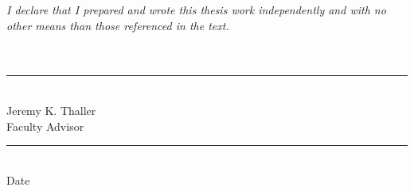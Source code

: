 \textit{I declare that I prepared and wrote this thesis work independently and with no other means
than those referenced in the text.}
\\
\\
\\
\parbox{2in}{\rule{2in}{0.4pt}\\ Jeremy K. Thaller\\Faculty Advisor}\hfill\parbox{2in}{\rule{1in}{0.4pt}\\ Date\\\mbox{}}

